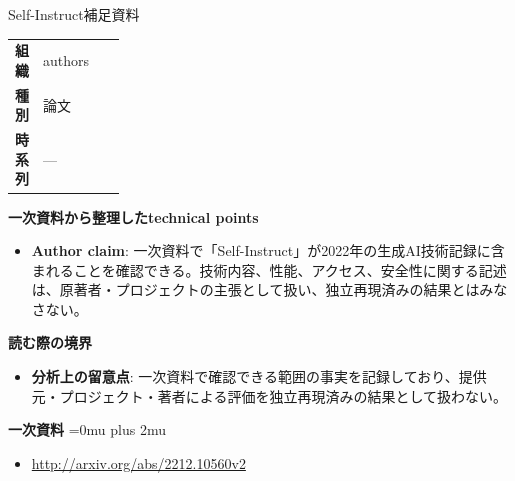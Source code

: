 \begin{technicalnote}{Self-Instruct}{補足資料}
\begingroup
\begin{tabularx}{\linewidth}{@{}>{\bfseries}p{0.22\linewidth}X@{}}
組織 & authors \\
種別 & 論文 \\
時系列 & — \\
\end{tabularx}
\smallskip
{\bfseries 一次資料から整理したtechnical points}
\begin{itemize}[leftmargin=1.5em,itemsep=0.35em]
\item \textbf{Author claim}: 一次資料で「Self-Instruct」が2022年の生成AI技術記録に含まれることを確認できる。技術内容、性能、アクセス、安全性に関する記述は、原著者・プロジェクトの主張として扱い、独立再現済みの結果とはみなさない。
\end{itemize}
\begin{minipage}{\linewidth}
{\bfseries 読む際の境界}
\begin{itemize}[leftmargin=1.5em,itemsep=0.35em]
\item \textbf{分析上の留意点}: 一次資料で確認できる範囲の事実を記録しており、提供元・プロジェクト・著者による評価を独立再現済みの結果として扱わない。
\end{itemize}
\begin{samepage}
{\bfseries 一次資料}
\begingroup\sloppy
\Urlmuskip=0mu plus 2mu\relax
\begin{itemize}[leftmargin=1.5em,itemsep=0.25em]
\item {\scriptsize\url{http://arxiv.org/abs/2212.10560v2}}
\end{itemize}
\endgroup
\end{samepage}
\end{minipage}
\endgroup
\end{technicalnote}
\medskip
